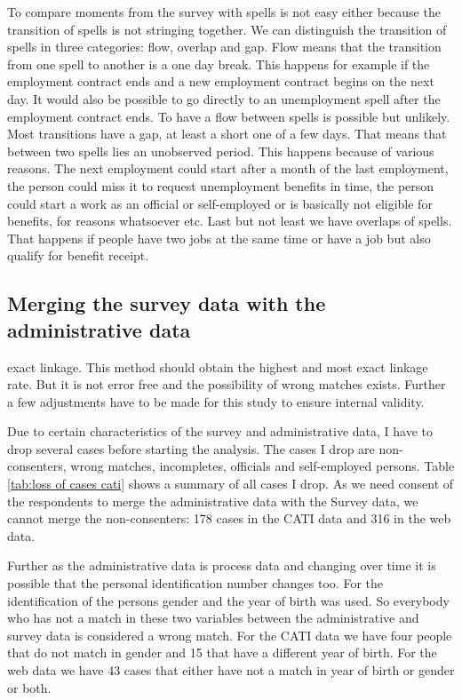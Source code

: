 To compare moments from the survey with spells is not easy either because the transition of spells is not stringing together. We can distinguish the transition of spells in three categories: flow, overlap and gap. Flow means that the transition from one spell to another is a one day break. This happens for example if the employment contract ends and a new employment contract begins on the next day. It would also be possible to go directly to an unemployment spell after the employment contract ends. To have a flow between spells is possible but unlikely. Most transitions have a gap, at least a short one of a few days. That means that between two spells lies an unobserved period. This happens because of various reasons. The next employment could start after a month of the last employment, the person could miss it to request unemployment benefits in time, the person could start a work as an official or self-employed or is basically not eligible for benefits, for reasons whatsoever etc. Last but not least we have overlaps of spells. That happens if people have two jobs at the same time or have a job but also qualify for benefit receipt.


\subsection{Merging the survey data with the administrative data}\label{mergeing}

exact linkage. This method should obtain the highest and most exact linkage rate. But it is not error free and the possibility of wrong matches exists. Further a few adjustments have to be made for this study to ensure internal validity.

Due to certain characteristics of the survey and administrative data, I have to drop several cases before starting the analysis. The cases I drop are non-consenters, wrong matches, incompletes, officials and self-employed persons. Table \ref{tab:loss of cases cati} shows a summary of all cases I drop. As we need consent of the respondents to merge the administrative data with the Survey data, we cannot merge the non-consenters: 178 cases in the CATI data and 316 in the web data.
	
	Further as the administrative data is process data and changing over time it is possible that the personal identification number changes too. For the identification of the persons gender and the year of birth was used. So everybody who has not a match in these two variables between the administrative and survey data is considered a wrong match. For the CATI data we have four people that do not match in gender and 15 that have a different year of birth. For the web data we have 43 cases that either have not a match in year of birth or gender or both. 

